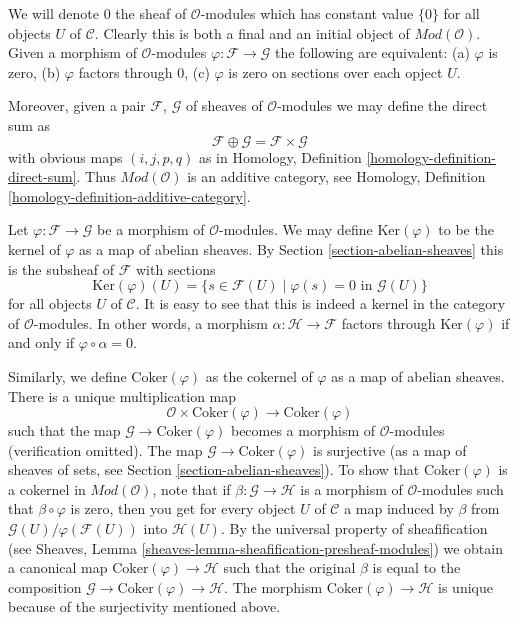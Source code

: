 \medskip\noindent
We will denote $0$ the sheaf of $\mathcal{O}$-modules
which has constant value $\{0\}$ for all objects $U$ of $\mathcal{C}$.
Clearly this is both a final and an initial object of
$\textit{Mod}(\mathcal{O})$. Given a morphism
of $\mathcal{O}$-modules $\varphi : \mathcal{F} \to \mathcal{G}$
the following are equivalent:
(a) $\varphi$ is zero, (b) $\varphi$ factors through $0$,
(c) $\varphi$ is zero on sections over each opject $U$.

\medskip\noindent
Moreover, given a pair
$\mathcal{F}$, $\mathcal{G}$ of sheaves of $\mathcal{O}$-modules
we may define the direct sum as
$$
\mathcal{F} \oplus \mathcal{G} = \mathcal{F} \times \mathcal{G}
$$
with obvious maps $(i, j, p, q)$ as in Homology, Definition
\ref{homology-definition-direct-sum}. Thus $\textit{Mod}(\mathcal{O})$
is an additive category, see
Homology, Definition \ref{homology-definition-additive-category}.

\medskip\noindent
Let $\varphi : \mathcal{F} \to \mathcal{G}$ be a morphism
of $\mathcal{O}$-modules. We may define $\text{Ker}(\varphi)$
to be the kernel of $\varphi$ as a map of abelian sheaves.
By Section \ref{section-abelian-sheaves} this is the
subsheaf of $\mathcal{F}$ with sections
$$
\text{Ker}(\varphi)(U) =
\{ s \in \mathcal{F}(U) \mid \varphi(s) = 0 \text{ in } \mathcal{G}(U)\}
$$
for all objects $U$ of $\mathcal{C}$. It is easy to see that this is indeed
a kernel in the category of $\mathcal{O}$-modules. In other words,
a morphism $\alpha : \mathcal{H} \to \mathcal{F}$ factors
through $\text{Ker}(\varphi)$ if and only if $\varphi \circ \alpha = 0$.

\medskip\noindent
Similarly, we define $\text{Coker}(\varphi)$ as the cokernel of
$\varphi$ as a map of abelian sheaves. There is a unique
multiplication map
$$
\mathcal{O} \times \text{Coker}(\varphi) \longrightarrow \text{Coker}(\varphi)
$$
such that the map $\mathcal{G} \to \text{Coker}(\varphi)$ becomes a
morphism of $\mathcal{O}$-modules (verification omitted).
The map $\mathcal{G} \to \text{Coker}(\varphi)$ is surjective
(as a map of sheaves of sets, see Section \ref{section-abelian-sheaves}).
To show that $\text{Coker}(\varphi)$ is a cokernel in
$\textit{Mod}(\mathcal{O})$, note that if
$\beta : \mathcal{G} \to \mathcal{H}$ is a morphism of $\mathcal{O}$-modules
such that $\beta \circ \varphi$ is zero, then you get for every
object $U$ of $\mathcal{C}$ a map induced by $\beta$ from
$\mathcal{G}(U)/\varphi(\mathcal{F}(U))$ into $\mathcal{H}(U)$.
By the universal property of sheafification (see
Sheaves, Lemma \ref{sheaves-lemma-sheafification-presheaf-modules})
we obtain a canonical map $\text{Coker}(\varphi) \to \mathcal{H}$
such that the original $\beta$ is equal to the composition
$\mathcal{G} \to \text{Coker}(\varphi) \to \mathcal{H}$.
The morphism $\text{Coker}(\varphi) \to \mathcal{H}$ is unique
because of the surjectivity mentioned above.


